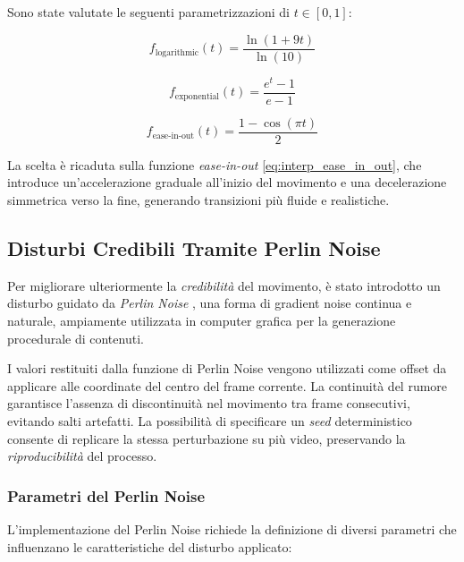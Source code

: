 Sono state valutate le seguenti parametrizzazioni di $t \in [0, 1]$:

\begin{equation}
    f_{\text{logarithmic}}(t) = \frac{\ln(1 + 9t)}{\ln(10)}
    \label{eq:interp_logarithmic}
\end{equation}

\begin{equation}
    f_{\text{exponential}}(t) = \frac{e^t - 1}{e - 1}
    \label{eq:interp_exponential}
\end{equation}

\begin{equation}
    f_{\text{ease-in-out}}(t) = \frac{1 - \cos(\pi t)}{2}
    \label{eq:interp_ease_in_out}
\end{equation}

La scelta è ricaduta sulla funzione \emph{ease-in-out} \eqref{eq:interp_ease_in_out}, che introduce un'accelerazione graduale all'inizio del movimento e una decelerazione simmetrica verso la fine, generando transizioni più fluide e realistiche.

\subsection{Disturbi Credibili Tramite Perlin Noise}
Per migliorare ulteriormente la \emph{credibilità} del movimento, è stato introdotto un disturbo guidato da \emph{Perlin Noise} \cite{perlin_image_1985}, una forma di gradient noise continua e naturale, ampiamente utilizzata in computer grafica per la generazione procedurale di contenuti.

I valori restituiti dalla funzione di Perlin Noise vengono utilizzati come offset da applicare alle coordinate del centro del frame corrente. La continuità del rumore garantisce l'assenza di discontinuità nel movimento tra frame consecutivi, evitando salti artefatti. La possibilità di specificare un \emph{seed} deterministico consente di replicare la stessa perturbazione su più video, preservando la \emph{riproducibilità} del processo.

\subsubsection{Parametri del Perlin Noise}
L'implementazione del Perlin Noise richiede la definizione di diversi parametri che influenzano le caratteristiche del disturbo applicato:

